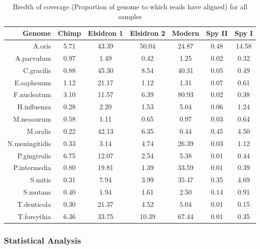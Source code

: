 \documentclass[12pt, a4paper]{article}
\begin{document}
\begin{table}[ht]
\centering
\caption{Bredth of coverage (Proportion of genome to which reads have aligned) for all samples}\label{table:coverage}
\begin{tabular}{rcccccc}
  \hline
 Genome & Chimp & Elsidron 1 & Elsidron 2 & Modern & Spy II & Spy I \\ 
  \hline
	A.oris & 5.71 & 43.39 & 50.04 & 24.87 & 0.48 & 14.58 \\ 
  	A.parvulum & 0.97 & 1.49 & 0.42 & 1.25 & 0.02 & 0.32 \\ 
  	C.gracilis & 0.88 & 45.30 & 8.54 & 40.31 & 0.05 & 0.49 \\ 
  	E.saphenum & 1.12 & 21.17 & 1.12 & 1.31 & 0.07 & 0.61 \\ 
  	F.nucleatum & 3.10 & 11.57 & 6.39 & 80.93 & 0.02 & 0.38 \\ 
  	H.influenza & 0.28 & 2.20 & 1.53 & 5.04 & 0.06 & 1.24 \\ 
  	M.neoaurum & 0.58 & 1.11 & 0.65 & 0.97 & 0.03 & 0.64 \\ 
  	M.oralis & 0.22 & 42.13 & 6.35 & 0.44 & 0.45 & 4.50 \\ 
  	N.meningitidis & 0.33 & 3.14 & 4.74 & 26.39 & 0.03 & 1.12 \\ 
  	P.gingivalis & 6.75 & 12.07 & 2.54 & 5.38 & 0.01 & 0.44 \\ 
  	P.intermedia & 0.80 & 19.81 & 1.39 & 33.59 & 0.01 & 0.39 \\ 
  	S.mitis & 0.31 & 7.94 & 3.99 & 35.47 & 0.35 & 4.69 \\ 
  	S.mutans & 0.40 & 1.94 & 1.61 & 2.50 & 0.14 & 0.91 \\ 
  	T.denticola & 0.30 & 21.37 & 4.52 & 5.04 & 0.01 & 0.15 \\ 
  	T.forsythia & 6.36 & 33.75 & 10.39 & 67.44 & 0.01 & 0.35 \\ 
   \hline
\end{tabular}
\end{table}

\subsubsection{Statistical Analysis}
\end{document}
